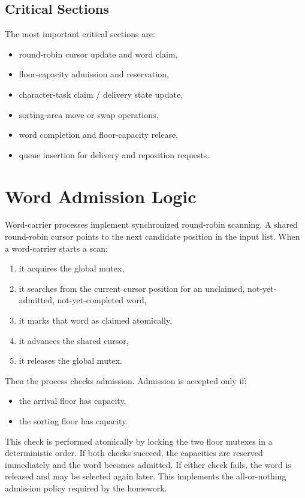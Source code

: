\documentclass[12pt,a4paper]{article}
\begin{document}
\subsection{Critical Sections}

The most important critical sections are:

\begin{itemize}[leftmargin=1.5em]
\item round-robin cursor update and word claim,
\item floor-capacity admission and reservation,
\item character-task claim / delivery state update,
\item sorting-area move or swap operations,
\item word completion and floor-capacity release,
\item queue insertion for delivery and reposition requests.
\end{itemize}

\section{Word Admission Logic}

Word-carrier processes implement synchronized round-robin scanning. A shared round-robin cursor points to the next candidate position in the input list. When a word-carrier starts a scan:

\begin{enumerate}[leftmargin=1.5em]
\item it acquires the global mutex,
\item it searches from the current cursor position for an unclaimed, not-yet-admitted, not-yet-completed word,
\item it marks that word as claimed atomically,
\item it advances the shared cursor,
\item it releases the global mutex.
\end{enumerate}

Then the process checks admission. Admission is accepted only if:

\begin{itemize}[leftmargin=1.5em]
\item the arrival floor has capacity,
\item the sorting floor has capacity.
\end{itemize}

This check is performed atomically by locking the two floor mutexes in a deterministic order. If both checks succeed, the capacities are reserved immediately and the word becomes admitted. If either check fails, the word is released and may be selected again later. This implements the all-or-nothing admission policy required by the homework.
\end{document}
